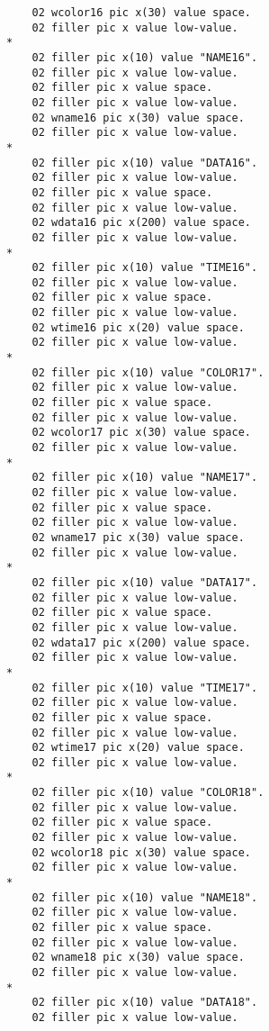 {{{\begin{verbatim}
          02 wcolor16 pic x(30) value space.
          02 filler pic x value low-value.
      *    
          02 filler pic x(10) value "NAME16".
          02 filler pic x value low-value.
          02 filler pic x value space.
          02 filler pic x value low-value.
          02 wname16 pic x(30) value space.
          02 filler pic x value low-value.
      *    
          02 filler pic x(10) value "DATA16".
          02 filler pic x value low-value.
          02 filler pic x value space.
          02 filler pic x value low-value.
          02 wdata16 pic x(200) value space.
          02 filler pic x value low-value.
      *    
          02 filler pic x(10) value "TIME16".
          02 filler pic x value low-value.
          02 filler pic x value space.
          02 filler pic x value low-value.
          02 wtime16 pic x(20) value space.
          02 filler pic x value low-value.
      *    
          02 filler pic x(10) value "COLOR17".
          02 filler pic x value low-value.
          02 filler pic x value space.
          02 filler pic x value low-value.
          02 wcolor17 pic x(30) value space.
          02 filler pic x value low-value.
      *    
          02 filler pic x(10) value "NAME17".
          02 filler pic x value low-value.
          02 filler pic x value space.
          02 filler pic x value low-value.
          02 wname17 pic x(30) value space.
          02 filler pic x value low-value.
      *    
          02 filler pic x(10) value "DATA17".
          02 filler pic x value low-value.
          02 filler pic x value space.
          02 filler pic x value low-value.
          02 wdata17 pic x(200) value space.
          02 filler pic x value low-value.
      *    
          02 filler pic x(10) value "TIME17".
          02 filler pic x value low-value.
          02 filler pic x value space.
          02 filler pic x value low-value.
          02 wtime17 pic x(20) value space.
          02 filler pic x value low-value.
      *    
          02 filler pic x(10) value "COLOR18".
          02 filler pic x value low-value.
          02 filler pic x value space.
          02 filler pic x value low-value.
          02 wcolor18 pic x(30) value space.
          02 filler pic x value low-value.
      *    
          02 filler pic x(10) value "NAME18".
          02 filler pic x value low-value.
          02 filler pic x value space.
          02 filler pic x value low-value.
          02 wname18 pic x(30) value space.
          02 filler pic x value low-value.
      *    
          02 filler pic x(10) value "DATA18".
          02 filler pic x value low-value.

\end{verbatim}}}}

